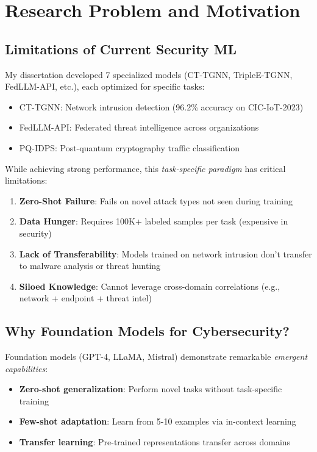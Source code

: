 \documentclass[11pt]{article}
\begin{document}
\section{Research Problem and Motivation}

\subsection{Limitations of Current Security ML}

My dissertation developed 7 specialized models (CT-TGNN, TripleE-TGNN, FedLLM-API, etc.), each optimized for specific tasks:
\begin{itemize}
    \item CT-TGNN: Network intrusion detection (96.2\% accuracy on CIC-IoT-2023)
    \item FedLLM-API: Federated threat intelligence across organizations
    \item PQ-IDPS: Post-quantum cryptography traffic classification
\end{itemize}

While achieving strong performance, this \textit{task-specific paradigm} has critical limitations:

\begin{enumerate}[leftmargin=*]
    \item \textbf{Zero-Shot Failure}: Fails on novel attack types not seen during training
    \item \textbf{Data Hunger}: Requires 100K+ labeled samples per task (expensive in security)
    \item \textbf{Lack of Transferability}: Models trained on network intrusion don't transfer to malware analysis or threat hunting
    \item \textbf{Siloed Knowledge}: Cannot leverage cross-domain correlations (e.g., network + endpoint + threat intel)
\end{enumerate}

\subsection{Why Foundation Models for Cybersecurity?}

Foundation models (GPT-4, LLaMA, Mistral) demonstrate remarkable \textit{emergent capabilities}:
\begin{itemize}
    \item \textbf{Zero-shot generalization}: Perform novel tasks without task-specific training
    \item \textbf{Few-shot adaptation}: Learn from 5-10 examples via in-context learning
    \item \textbf{Transfer learning}: Pre-trained representations transfer across domains
\end{itemize}
\end{document}
